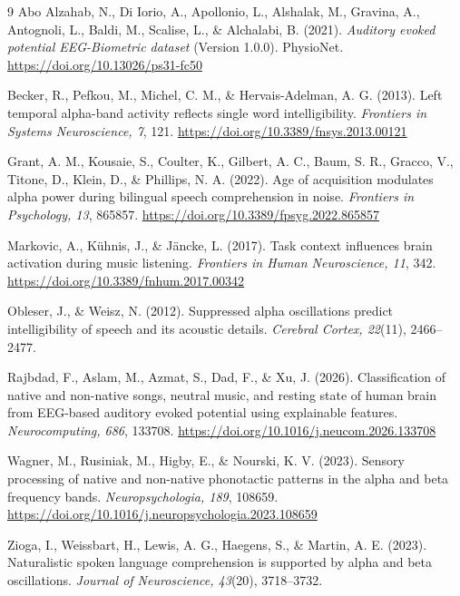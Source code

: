 \documentclass[11pt,a4paper]{article}
\begin{document}
\begin{thebibliography}{9}
 Abo Alzahab, N., Di Iorio, A., Apollonio, L., Alshalak, M., Gravina, A., Antognoli, L., Baldi, M., Scalise, L., \& Alchalabi, B. (2021). \textit{Auditory evoked potential EEG-Biometric dataset} (Version 1.0.0). PhysioNet. \url{https://doi.org/10.13026/ps31-fc50}

 Becker, R., Pefkou, M., Michel, C. M., \& Hervais-Adelman, A. G. (2013). Left temporal alpha-band activity reflects single word intelligibility. \textit{Frontiers in Systems Neuroscience, 7}, 121. \url{https://doi.org/10.3389/fnsys.2013.00121}

 Grant, A. M., Kousaie, S., Coulter, K., Gilbert, A. C., Baum, S. R., Gracco, V., Titone, D., Klein, D., \& Phillips, N. A. (2022). Age of acquisition modulates alpha power during bilingual speech comprehension in noise. \textit{Frontiers in Psychology, 13}, 865857. \url{https://doi.org/10.3389/fpsyg.2022.865857}

 Markovic, A., Kühnis, J., \& Jäncke, L. (2017). Task context influences brain activation during music listening. \textit{Frontiers in Human Neuroscience, 11}, 342. \url{https://doi.org/10.3389/fnhum.2017.00342}

 Obleser, J., \& Weisz, N. (2012). Suppressed alpha oscillations predict intelligibility of speech and its acoustic details. \textit{Cerebral Cortex, 22}(11), 2466--2477.

 Rajbdad, F., Aslam, M., Azmat, S., Dad, F., \& Xu, J. (2026). Classification of native and non-native songs, neutral music, and resting state of human brain from EEG-based auditory evoked potential using explainable features. \textit{Neurocomputing, 686}, 133708. \url{https://doi.org/10.1016/j.neucom.2026.133708}

 Wagner, M., Rusiniak, M., Higby, E., \& Nourski, K. V. (2023). Sensory processing of native and non-native phonotactic patterns in the alpha and beta frequency bands. \textit{Neuropsychologia, 189}, 108659. \url{https://doi.org/10.1016/j.neuropsychologia.2023.108659}

 Zioga, I., Weissbart, H., Lewis, A. G., Haegens, S., \& Martin, A. E. (2023). Naturalistic spoken language comprehension is supported by alpha and beta oscillations. \textit{Journal of Neuroscience, 43}(20), 3718--3732.

\end{thebibliography}
\end{document}

